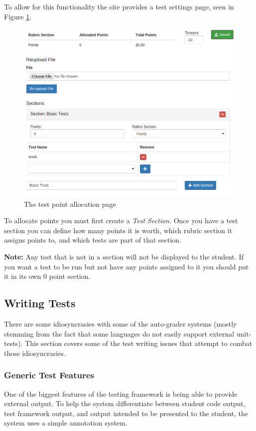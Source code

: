 \documentclass[11pt]{report}
\begin{document}
To allow for this functionality the site provides a test settings page, 
seen in Figure \ref{fig:test_settings}.
\begin{figure}
\centering
\includegraphics[width=\textwidth,height=\textheight,keepaspectratio]{diagrams/test_settings}
\caption{The test point allocation page}
\label{fig:test_settings}
\end{figure}

To allocate points you must first create a \emph{Test Section}. Once you have a test section you can 
define how many points it is worth, which rubric section it assigns points to, and which tests are 
part of that section. 

\noindent\textbf{Note:} Any test that is not in a section will not be displayed to the student. If you want
a test to be run but not have any points assigned to it you should put it in its own 0 point section.


\subsection{Writing Tests}
\label{sec:writing_tests}
There are some idiosyncrasies with some of the auto-grader systems (mostly stemming from the fact 
that some languages do not easily support external unit-tests). This section covers some of the 
test writing issues that attempt to combat those idiosyncrasies.

\subsubsection{Generic Test Features}
One of the biggest features of the testing framework is being able to provide external output.
To help the system differentiate between student code output, test framework output, and output 
intended to be presented to the student, the system uses a simple annotation system. 
\end{document}
